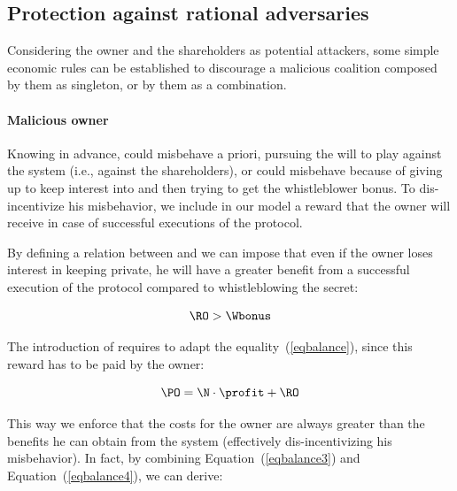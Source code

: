 \subsection{Protection against rational adversaries}\label{sect:protection}

Considering the owner and the shareholders as potential attackers, some simple economic rules can be established to discourage a malicious coalition composed by them as singleton, or by them as a combination.

\paragraph{Malicious owner}

Knowing \secret in advance, \owner could misbehave a priori, pursuing the will to play against the system (i.e., against the shareholders), or could misbehave because of giving up to keep interest into \secret and then trying to get the whistleblower bonus.
%
To dis-incentivize his misbehavior, we include in our model a reward \RO that the owner will receive in case of successful executions of the protocol.
%

By defining a relation between \Wbonus and \RO we can impose that even if the owner loses interest in keeping \secret private, he will have a greater benefit from a successful execution of the protocol compared to whistleblowing the secret:

\begin{equation}\label{eqbalance3}
\RO > \Wbonus
\end{equation}

The introduction of \RO requires to adapt the equality~(\ref{eqbalance}), since this reward has to be paid by the owner:

\begin{equation}\label{eqbalance4}
\PO = \N \cdot \profit  + \RO
\end{equation}

This way we enforce that the costs for the owner are always greater than the benefits he can obtain from the system (effectively dis-incentivizing his misbehavior). In fact, by combining Equation~(\ref{eqbalance3}) and Equation~(\ref{eqbalance4}), we can derive:

